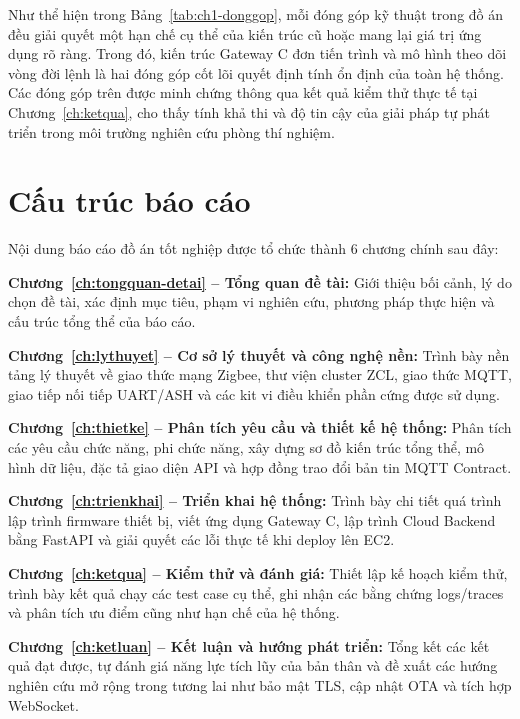 Như thể hiện trong Bảng~\ref{tab:ch1-donggop}, mỗi đóng góp kỹ thuật trong đồ án đều giải quyết một hạn chế cụ thể của kiến trúc cũ hoặc mang lại giá trị ứng dụng rõ ràng. Trong đó, kiến trúc Gateway C đơn tiến trình và mô hình theo dõi vòng đời lệnh là hai đóng góp cốt lõi quyết định tính ổn định của toàn hệ thống. Các đóng góp trên được minh chứng thông qua kết quả kiểm thử thực tế tại Chương~\ref{ch:ketqua}, cho thấy tính khả thi và độ tin cậy của giải pháp tự phát triển trong môi trường nghiên cứu phòng thí nghiệm.

\section{Cấu trúc báo cáo}
\label{sec:ch1-cautruc}

Nội dung báo cáo đồ án tốt nghiệp được tổ chức thành 6 chương chính sau đây:

\textbf{Chương~\ref{ch:tongquan-detai} -- Tổng quan đề tài:} Giới thiệu bối cảnh, lý do chọn đề tài, xác định mục tiêu, phạm vi nghiên cứu, phương pháp thực hiện và cấu trúc tổng thể của báo cáo.

\textbf{Chương~\ref{ch:lythuyet} -- Cơ sở lý thuyết và công nghệ nền:} Trình bày nền tảng lý thuyết về giao thức mạng Zigbee, thư viện cluster ZCL, giao thức MQTT, giao tiếp nối tiếp UART/ASH và các kit vi điều khiển phần cứng được sử dụng.

\textbf{Chương~\ref{ch:thietke} -- Phân tích yêu cầu và thiết kế hệ thống:} Phân tích các yêu cầu chức năng, phi chức năng, xây dựng sơ đồ kiến trúc tổng thể, mô hình dữ liệu, đặc tả giao diện API và hợp đồng trao đổi bản tin MQTT Contract.

\textbf{Chương~\ref{ch:trienkhai} -- Triển khai hệ thống:} Trình bày chi tiết quá trình lập trình firmware thiết bị, viết ứng dụng Gateway C, lập trình Cloud Backend bằng FastAPI và giải quyết các lỗi thực tế khi deploy lên EC2.

\textbf{Chương~\ref{ch:ketqua} -- Kiểm thử và đánh giá:} Thiết lập kế hoạch kiểm thử, trình bày kết quả chạy các test case cụ thể, ghi nhận các bằng chứng logs/traces và phân tích ưu điểm cũng như hạn chế của hệ thống.

\textbf{Chương~\ref{ch:ketluan} -- Kết luận và hướng phát triển:} Tổng kết các kết quả đạt được, tự đánh giá năng lực tích lũy của bản thân và đề xuất các hướng nghiên cứu mở rộng trong tương lai như bảo mật TLS, cập nhật OTA và tích hợp WebSocket.
